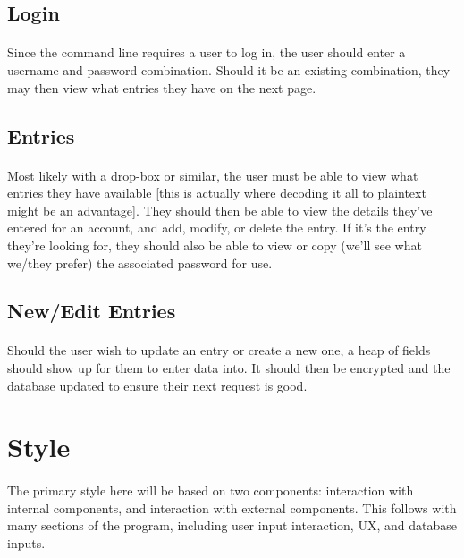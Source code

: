 \documentclass{article}
\begin{document}
	\subsection{Login}
	\paragraph{}
Since the command line requires a user to log in, the user should enter a username and password combination. Should it be an existing combination, they may then view what entries they have on the next page.

	\subsection{Entries}
	\paragraph{}
Most likely with a drop-box or similar, the user must be able to view what entries they have available [this is actually where decoding it all to plaintext might be an advantage]. They should then be able to view the details they've entered for an account, and add, modify, or delete the entry. If it's the entry they're looking for, they should also be able to view or copy (we'll see what we/they prefer) the associated password for use.

	\subsection{New/Edit Entries}
	\paragraph{}
Should the user wish to update an entry or create a new one, a heap of fields should show up for them to enter data into. It should then be encrypted and the database updated to ensure their next request is good.

	\newpage

	\section{Style}
	\paragraph{}
The primary style here will be based on two components: interaction with internal components, and interaction with external components. This follows with many sections of the program, including user input interaction, UX, and database inputs.
\end{document}
